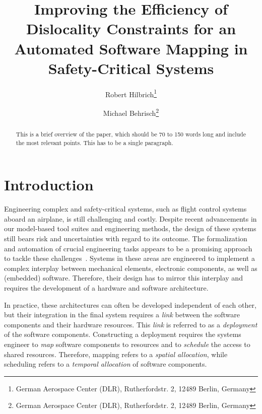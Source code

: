 \documentclass[english,biblatex]{lni}
\begin{document}
\title[Improving the Efficiency of Dislocality Constraints]{Improving the Efficiency of Dislocality Constraints for an Automated Software Mapping in Safety-Critical Systems}
\author[Robert Hilbrich \and Michael Behrisch]
{Robert Hilbrich\footnote{German Aerospace Center (DLR), Rutherfordstr. 2, 12489 Berlin,
Germany } \and
Michael Behrisch\footnote{German Aerospace Center (DLR), Rutherfordstr. 2, 12489 Berlin,
Germany }}


\maketitle

\begin{abstract}
This is a brief overview of the paper, which should be 70 to 150 words long and
include the most relevant points. This has to be a single paragraph.
\end{abstract}




\section{Introduction}

Engineering complex and safety-critical systems, such as flight control systems aboard an airplane, is still challenging and costly.
Despite recent advancements in our model-based tool suites and engineering methods, the design of these systems still bears risk and uncertainties with regard to its outcome.
The formalization and automation of crucial engineering tasks appears to be a promising approach to tackle these challenges~\cite{Chapman2007}.
Systems in these areas are engineered to implement a complex interplay between mechanical elements, electronic components, as well as (embedded) software.
Therefore, their design has to mirror this interplay and requires the development of a hardware and software architecture.

In practice, these architectures can often be developed independent of each other, but their integration in the final system requires a \emph{link} between the software components and their hardware resources.     
This \emph{link} is referred to as a \emph{deployment} of the software components.
Constructing a deployment requires the systems engineer to \emph{map} software components to resources and to \emph{schedule} the access to shared resources.
Therefore, mapping refers to a \emph{spatial allocation}, while scheduling refers to a \emph{temporal allocation} of software components.
\end{document}
